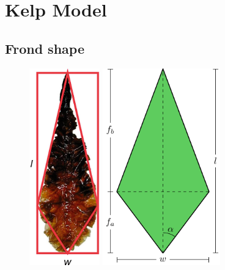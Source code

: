 \section{Kelp Model}

\subsection{Frond shape}
\label{sec:shape}


\begin{figure}[h]
	\centering
  \includegraphics[width=1.2in]{kelp_photo/kite}
  \qquad
	\includegraphics[width=2in]{frond}
	\label{fig:frond}
\end{figure}

